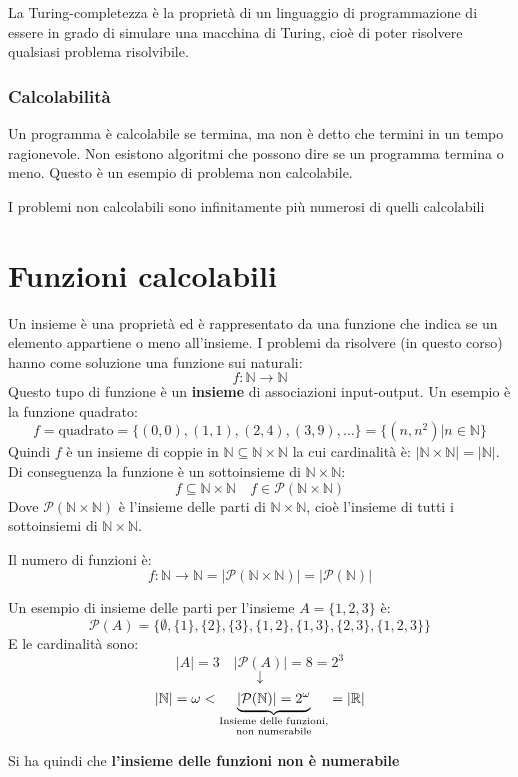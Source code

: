 \documentclass[a4paper]{article}
\begin{document}
\begin{define}
  La Turing-completezza è la proprietà di un linguaggio di programmazione di essere
  in grado di simulare una macchina di Turing, cioè di poter risolvere qualsiasi problema
  risolvibile.
\end{define}

\subsubsection{Calcolabilità}
Un programma è calcolabile se termina, ma non è detto che termini in un tempo ragionevole.
Non esistono algoritmi che possono dire se un programma termina o meno. Questo è un esempio
di problema non calcolabile.

I problemi non calcolabili sono infinitamente più numerosi di quelli calcolabili

\section{Funzioni calcolabili}
Un insieme è una proprietà ed è rappresentato da una funzione che indica se un elemento
appartiene o meno all'insieme. I problemi da risolvere (in questo corso) hanno come
soluzione una funzione sui naturali:
\[
  f : \mathbb{N} \to \mathbb{N}
\] 
Questo tupo di funzione è un \textbf{insieme} di associazioni input-output. Un esempio
è la funzione quadrato:
\[
  f = \text{quadrato} = \{(0,0), (1,1), (2,4), (3,9), \ldots\} = \{(n,n^2) | n \in \mathbb{N}\}
\] 
Quindi \( f \) è un insieme di coppie in \( \mathbb{N} \subseteq \mathbb{N} \times \mathbb{N} \) la
cui cardinalità è: \( \left| \mathbb{N} \times \mathbb{N} \right| =
\left| \mathbb{N} \right| \). Di conseguenza la funzione è un sottoinsieme di \( \mathbb{N}
\times \mathbb{N}\):
\[
  f \subseteq \mathbb{N} \times \mathbb{N} \quad f \in \mathcal{P}(\mathbb{N} \times \mathbb{N})
\] 
Dove \( \mathcal{P}(\mathbb{N} \times \mathbb{N}) \) è l'insieme delle parti di \( \mathbb{N}
\times \mathbb{N} \), cioè l'insieme di tutti i sottoinsiemi di \( \mathbb{N} \times
\mathbb{N} \).

Il numero di funzioni è:
\[
  f: \mathbb{N} \to \mathbb{N} = \left| \mathcal{P}(\mathbb{N} \times \mathbb{N}) \right| 
  = \left| \mathcal{P}(\mathbb{N}) \right| 
\] 
\begin{example}
  Un esempio di insieme delle parti per l'insieme \( A = \{1,2,3\} \) è:
  \[
    \mathcal{P}(A) = \{\emptyset, \{1\}, \{2\}, \{3\}, \{1,2\}, \{1,3\}, \{2,3\}, \{1,2,3\}\}
  \] 
  E le cardinalità sono:
  \[
    \left| A \right| = 3 \quad \left| \mathcal{P}(A) \right| = 8 = 2^3
  \] 
  \[
    \downarrow
  \] 
  \[
    \left| \mathbb{N} \right| = \omega < 
    \underbrace{\left| \mathcal{P}(\mathbb{N}) \right| = 2^{\omega}}_{%
      \substack{\text{Insieme delle funzioni,}\\ 
      \text{non numerabile}}
    }
    = \left| \mathbb{R} \right| 
  \] 
\end{example}
Si ha quindi che \textbf{l'insieme delle funzioni non è numerabile}
\end{document}

